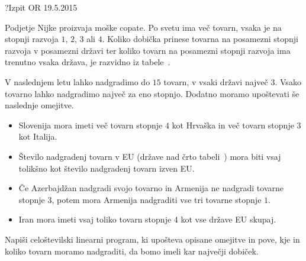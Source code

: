 \begin{naloga}{?}{Izpit OR 19.5.2015}
\begin{vprasanje}[nijke]
Podjetje Nijke proizvaja moške copate.
Po svetu ima več tovarn,
vsaka je na stopnji razvoja $1$, $2$, $3$ ali $4$.
Koliko dobička prinese
tovarna na posamezni stopnji razvoja v posamezni državi
ter koliko tovarn na posamezni stopnji razvoja ima trenutno vsaka država,
je razvidno iz tabele~\tab{}.

V naslednjem letu lahko nadgradimo do $15$ tovarn,
v vsaki državi največ $3$.
Vsako tovarno lahko nadgradimo največ za eno stopnjo.
Dodatno moramo upoštevati še naslednje omejitve.
\begin{itemize}
\item Slovenija mora imeti več tovarn stopnje $4$ kot Hrvaška
in več tovarn stopnje $3$ kot Italija.
\item Število nadgradenj tovarn v EU (države nad črto tabeli~\tab{})
mora biti vsaj tolikšno kot število nadgradenj tovarn izven EU.
\item Če Azerbajdžan nadgradi svojo tovarno
in Armenija ne nadgradi tovarne stopnje $3$,
potem mora Armenija nadgraditi vse tri tovarne stopnje $1$.
\item Iran mora imeti vsaj toliko tovarn stopnje $4$
kot vse države EU skupaj.
\end{itemize}

Napiši celoštevilski linearni program,
ki upošteva opisane omejitve in pove,
kje in koliko tovarn moramo nadgraditi, da bomo imeli kar največji dobiček.


\end{vprasanje}
\end{naloga}
